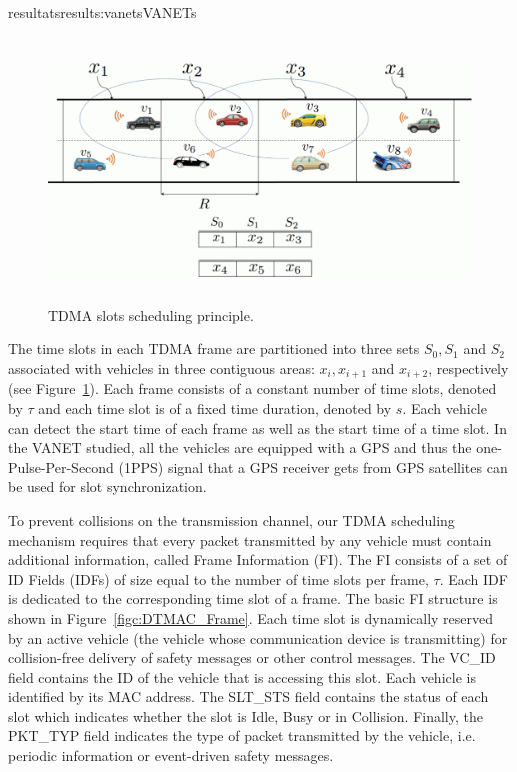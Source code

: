 \documentclass{ra2016}
\begin{document}
\begin{module}{resultats}{results:vanets}{VANETs}
\begin{figure}[!htbp]
  \begin{center}
  \includegraphics[height=7cm,width=14cm]{IMG/DTMAC_idea.pdf}
  \end{center}
  \caption{TDMA slots scheduling principle.}
 \label{figc:DTMAC_idea}
\end{figure}

The time slots in each TDMA frame are partitioned into three sets $S_0, S_1$ and $S_2$ associated with vehicles in three 
contiguous areas: $x_i, x_{i+1}$ and $x_{i+2}$, respectively (see Figure~\ref{figc:DTMAC_idea}). Each frame consists of a 
constant number of time slots, denoted by $\tau$ and each time slot is of a fixed time duration, denoted by $s$. Each vehicle 
can detect the start time of each frame as well as the start time of a time slot. In the VANET studied, all the vehicles are 
equipped with a GPS and thus the one-Pulse-Per-Second (1PPS) signal that a GPS receiver gets from GPS 
satellites can be used for slot synchronization. 

To prevent collisions on the transmission channel, our TDMA scheduling mechanism requires that every packet transmitted by 
any vehicle must contain additional information, called Frame Information (FI). The FI consists of a set of ID Fields (IDFs) of 
size equal to the number of time slots per frame, $\tau$. Each IDF is dedicated to the corresponding time slot of a frame. The 
basic FI structure is shown in Figure~\ref{figc:DTMAC_Frame}. Each time slot is dynamically reserved by an active vehicle 
(the vehicle whose communication device is transmitting) for collision-free delivery of safety messages or other control messages.
The VC\_ID field contains the ID of the vehicle that is accessing this slot. Each vehicle is identified by its MAC address. The 
SLT\_STS field contains the status of each slot which indicates whether the slot is Idle, Busy or in Collision. Finally, the 
PKT\_TYP field indicates the type of packet transmitted by the vehicle, i.e. periodic information or event-driven safety messages.


\end{module}
\end{document}
